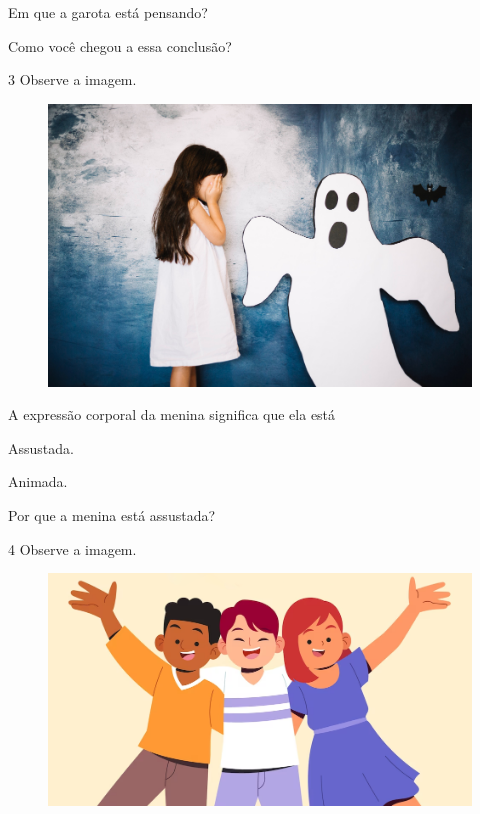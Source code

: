 \begin{escolha}
\item Em que a garota está pensando?\\

\item Como você chegou a essa conclusão?\\
\end{escolha}

\num{3} Observe a imagem.

\begin{figure}[H]
\centering
\includegraphics[width=.6\textwidth]{media/image204.jpg}
\end{figure}

\begin{escolha}
\item A expressão corporal da menina significa que ela está

\begin{boxlist}
 Assustada.

 Animada.
\end{boxlist}

\item Por que a menina está assustada?\\

\end{escolha}

\num{4} Observe a imagem.

\begin{figure}[H]
\centering
\includegraphics[width=.7\textwidth]{media/image203.png}
\end{figure}

